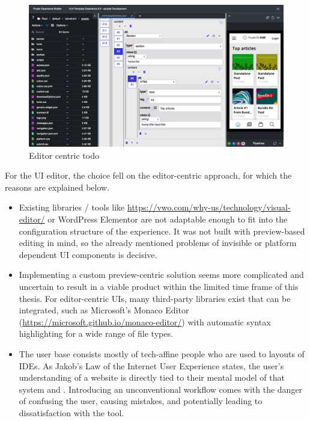 \begin{figure}[h!]
  \includegraphics[width=\textwidth]{pics/editor-centric-screenshot.png}
  \caption{Editor centric todo}
  \label{fig:editor-centric}
\end{figure}
\bigskip

For the UI editor, the choice fell on the editor-centric approach, for which the reasons are explained below.
\begin{itemize}
  \item Existing libraries / tools like \url{https://vwo.com/why-us/technology/visual-editor/} or WordPress Elementor are not adaptable enough to fit into the configuration structure of the  \Gls{experience}. It was not built with preview-based editing in mind, so the already mentioned problems of invisible or platform dependent UI components is decisive.
  \item Implementing a custom preview-centric solution seems more complicated and uncertain to result in a viable product within the limited time frame of this thesis. For editor-centric UIs, many third-party libraries exist that can be integrated, such as Microsoft's Monaco Editor (\url{https://microsoft.github.io/monaco-editor/}) with automatic syntax highlighting for a wide range of file types.
  \item The user base consists mostly of tech-affine people who are used to layouts of IDEs. As Jakob's Law of the Internet User Experience states, the user's understanding of a website is directly tied to their mental model of that system \cite{Nielsen:2000} and \cite[p. 2]{LawsOfUX:2020ys}. Introducing an unconventional workflow comes with the danger of confusing the user, causing mistakes, and potentially leading to dissatisfaction with the tool.
\end{itemize}

